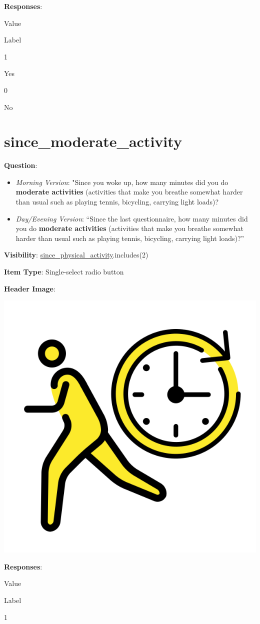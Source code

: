 \documentclass[]{book}
\providecommand{\tightlist}{%
  \setlength{\itemsep}{0pt}\setlength{\parskip}{0pt}}
\begin{document}
\textbf{Responses}:

Value

Label

1

Yes

0

No

\hypertarget{since_moderate_activity}{%
\section{since\_moderate\_activity}\label{since_moderate_activity}}

\textbf{Question}:

\begin{itemize}
\tightlist
\item
  \emph{Morning Version}: "Since you woke up, how many minutes did you do \textbf{moderate activities} (activities that make you breathe somewhat harder than usual such as playing tennis, bicycling, carrying light loads)?
\item
  \emph{Day/Evening Version}: ``Since the last questionnaire, how many minutes did you do \textbf{moderate activities} (activities that make you breathe somewhat harder than usual such as playing tennis, bicycling, carrying light loads)?''
\end{itemize}

\textbf{Visibility}: \protect\hyperlink{since_physical_activity}{since\_physical\_activity}.includes(2)

\textbf{Item Type}: Single-select radio button

\textbf{Header Image}:

\begin{flushleft}\includegraphics[width=0.33\linewidth]{downloadFigs4latex_NIMH_Applet_Codebook/since_moderate_activity_headerImg} \end{flushleft}

\textbf{Responses}:

Value

Label

1
\end{document}
